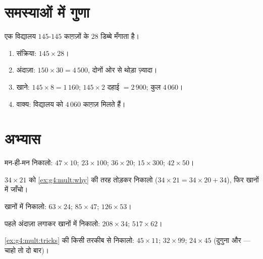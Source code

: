 \section{समस्याओं में गुणा}

\begin{example}\label{ex:g4:mult:problem}
एक विद्यालय $145$-$145$ काग़ज़ों के $28$ डिब्बे मँगाता है।
\begin{enumerate}
  \item संक्रिया: $145 \times 28$।
  \item अंदाज़ा: $150 \times 30 = 4\,500$, दोनों ओर से थोड़ा
        ज़्यादा।
  \item खाने: $145 \times 8 = 1\,160$; $145 \times 2$ दहाई
        $= 2\,900$; कुल $4\,060$।
  \item वाक्य: विद्यालय को $4\,060$ काग़ज़ मिलते हैं।
\end{enumerate}
\end{example}

\section{अभ्यास}

\begin{exercise}[$\star$]\label{exo:g4:mult:1}
मन-ही-मन निकालो: $47 \times 10$; \quad $23 \times 100$; \quad
$36 \times 20$; \quad $15 \times 300$; \quad $42 \times 50$।
\end{exercise}

\begin{exercise}[$\star$]\label{exo:g4:mult:2}
$34 \times 21$ को \cref{ex:g4:mult:why} की तरह तोड़कर निकालो
($34 \times 21 = 34 \times 20 + 34$), फिर खानों में जाँचो।
\end{exercise}

\begin{exercise}[$\star$]\label{exo:g4:mult:3}
खानों में निकालो: $63 \times 24$; \quad $85 \times 47$; \quad
$126 \times 53$।
\end{exercise}

\begin{exercise}[$\star$]\label{exo:g4:mult:4}
पहले अंदाज़ा लगाकर खानों में निकालो: $208 \times 34$; \quad
$517 \times 62$।
\end{exercise}

\begin{exercise}[$\star$]\label{exo:g4:mult:5}
\cref{ex:g4:mult:tricks} की किसी तरकीब से निकालो:
$45 \times 11$; \quad $32 \times 99$; \quad $24 \times 45$
(दुगुना और  --- चाहो तो दो बार)।
\end{exercise}

